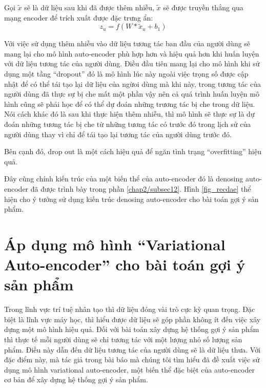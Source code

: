     Gọi $\tilde{x}$ sẽ là dữ liệu sau khi đã được thêm nhiễu, $\tilde{x}$ sẽ được truyền thẳng qua mạng encoder để trích xuất được đặc trưng ẩn:
    \begin{equation}
        \label{z_u_with_x_tilde}
        z_u = f(W * \tilde{x}_u + b_1)
    \end{equation}
    
    Với việc sử dụng thêm nhiễu vào dữ liệu tương tác ban đầu của người dùng sẽ mang lại cho mô hình auto-encoder phù hợp hơn và hiệu quả hơn khi huấn luyện với dữ liệu tương tác của người dùng.
    Điều đầu tiên mang lại cho mô hình khi sử dụng một tầng ``dropout'' đó là mô hình lúc này ngoài việc trọng số được cập nhật để có thể tái tạo lại dữ liệu của ngừoi dùng mà khi này, trong tương tác của người dùng đã thực sự bị che mất một phần vậy nên cả quá trình huấn luyện mô hình cũng sẽ phải học để có thể dự đoán những trương tác bị che trong dữ liệu. Nói cách khác đó là sau khi thực hiện thêm nhiễu, thì mô hình sẽ thực sự là dự đoán những tương tác bị che từ những tương tác có trước đó trong lịch sử của người dùng thay vì chỉ để tái tạo lại tương tác của người dùng trước đó.

    Bên cạnh đó, drop out là một cách hiệu quả để ngăn tình trạng ``overfitting'' hiệu quả.

    Đây cũng chính kiến trúc của một biến thể của auto-encoder đó là denosing auto-encoder đã được trình bày trong phần \ref{chap2/subsec12}.
    Hình \ref{fig_recdae} thể hiện cho ý tưởng sử dụng kiến trúc denosing auto-encoder cho bài toán gợi ý sản phẩm.     

    

\section{Áp dụng mô hình ``Variational Auto-encoder'' cho bài toán gợi ý sản phẩm}
    Trong lĩnh vực trí tuệ nhân tạo thì dữ liệu đóng vài trò cực kỳ quan trọng.
    Đặc biệt là lĩnh vực máy học, thì hiểu được dữ liệu sẽ góp phần không ít đến việc xây dựng một mô hình hiệu quả. 
    Đối với bài toán xây dựng hệ thống gợi ý sản phẩm thì thực tế mỗi người dùng sẽ chỉ tương tác với một lượng nhỏ số lượng sản phẩm.
    Điều này dẫn đến dữ liệu tương tác của người dùng sẽ là dữ liệu thưa.
    Với đặc điểm này, mà tác giả trong bài báo \cite{mvae} mà chúng tôi tìm hiểu đã đề xuất việc sử dụng mô hình variational auto-encoder, một biến thể đặc biệt của auto-encoder cơ bản để xây dựng hệ thống gợi ý sản phẩm.


